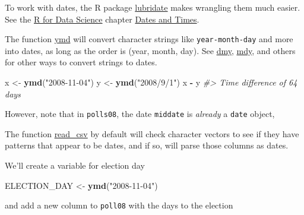 \documentclass[]{book}
\newenvironment{Shaded}{\begin{snugshade}}{\end{snugshade}}
\newcommand{\KeywordTok}[1]{\textcolor[rgb]{0.13,0.29,0.53}{\textbf{#1}}}
\newcommand{\StringTok}[1]{\textcolor[rgb]{0.31,0.60,0.02}{#1}}
\newcommand{\CommentTok}[1]{\textcolor[rgb]{0.56,0.35,0.01}{\textit{#1}}}
\newcommand{\OperatorTok}[1]{\textcolor[rgb]{0.81,0.36,0.00}{\textbf{#1}}}
\newcommand{\NormalTok}[1]{#1}
\theoremstyle{definition}
\theoremstyle{definition}
\theoremstyle{definition}
\theoremstyle{remark}
\begin{document}
To work with dates, the R package
\href{https://cran.r-project.org/package=lubridate}{lubridate} makes
wrangling them much easier. See the \href{http://r4ds.had.co.nz/}{R for
Data Science} chapter
\href{http://r4ds.had.co.nz/dates-and-times.html}{Dates and Times}.

The function
\href{https://www.rdocumentation.org/packages/lubridate/topics/ymd}{ymd}
will convert character strings like \texttt{year-month-day} and more
into dates, as long as the order is (year, month, day). See
\href{https://www.rdocumentation.org/packages/lubridate/topics/dmy}{dmy},
\href{https://www.rdocumentation.org/packages/lubridate/topics/mdy}{mdy},
and others for other ways to convert strings to dates.

\begin{Shaded}
\begin{Highlighting}[]
\NormalTok{x <-}\StringTok{ }\KeywordTok{ymd}\NormalTok{(}\StringTok{"2008-11-04"}\NormalTok{)}
\NormalTok{y <-}\StringTok{ }\KeywordTok{ymd}\NormalTok{(}\StringTok{"2008/9/1"}\NormalTok{)}
\NormalTok{x }\OperatorTok{-}\StringTok{ }\NormalTok{y}
\CommentTok{#> Time difference of 64 days}
\end{Highlighting}
\end{Shaded}

However, note that in \texttt{polls08}, the date \texttt{middate} is
\emph{already} a \texttt{date} object,

\begin{Shaded}
\end{Shaded}

The function
\href{https://www.rdocumentation.org/packages/readr/topics/read_csv}{read\_csv}
by default will check character vectors to see if they have patterns
that appear to be dates, and if so, will parse those columns as dates.

We'll create a variable for election day

\begin{Shaded}
\begin{Highlighting}[]
\NormalTok{ELECTION_DAY <-}\StringTok{ }\KeywordTok{ymd}\NormalTok{(}\StringTok{"2008-11-04"}\NormalTok{)}
\end{Highlighting}
\end{Shaded}

and add a new column to \texttt{poll08} with the days to the election
\end{document}
